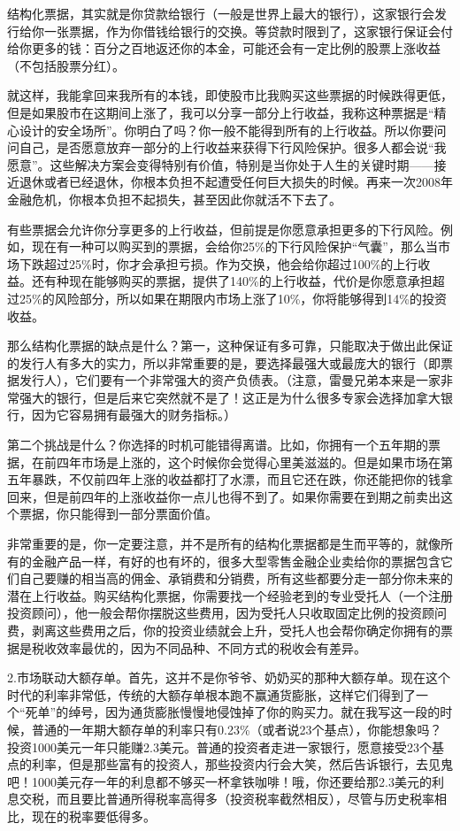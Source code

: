 结构化票据，其实就是你贷款给银行（一般是世界上最大的银行），这家银行会发行给你一张票据，作为你借钱给银行的交换。等贷款时限到了，这家银行保证会付给你更多的钱：百分之百地返还你的本金，可能还会有一定比例的股票上涨收益（不包括股票分红）。

就这样，我能拿回来我所有的本钱，即使股市比我购买这些票据的时候跌得更低，但是如果股市在这期间上涨了，我可以分享一部分上行收益，我称这种票据是“精心设计的安全场所”。你明白了吗？你一般不能得到所有的上行收益。所以你要问问自己，是否愿意放弃一部分的上行收益来获得下行风险保护。很多人都会说“我愿意”。这些解决方案会变得特别有价值，特别是当你处于人生的关键时期——接近退休或者已经退休，你根本负担不起遭受任何巨大损失的时候。再来一次2008年金融危机，你根本负担不起损失，甚至因此你就活不下去了。

有些票据会允许你分享更多的上行收益，但前提是你愿意承担更多的下行风险。例如，现在有一种可以购买到的票据，会给你25\%的下行风险保护“气囊”，那么当市场下跌超过25\%时，你才会承担亏损。作为交换，他会给你超过100\%的上行收益。还有种现在能够购买的票据，提供了140\%的上行收益，代价是你愿意承担超过25\%的风险部分，所以如果在期限内市场上涨了10\%，你将能够得到14\%的投资收益。

那么结构化票据的缺点是什么？第一，这种保证有多可靠，只能取决于做出此保证的发行人有多大的实力，所以非常重要的是，要选择最强大或最庞大的银行（即票据发行人），它们要有一个非常强大的资产负债表。（注意，雷曼兄弟本来是一家非常强大的银行，但是后来它突然就不是了！这正是为什么很多专家会选择加拿大银行，因为它容易拥有最强大的财务指标。）

第二个挑战是什么？你选择的时机可能错得离谱。比如，你拥有一个五年期的票据，在前四年市场是上涨的，这个时候你会觉得心里美滋滋的。但是如果市场在第五年暴跌，不仅前四年上涨的收益都打了水漂，而且它还在跌，你还能把你的钱拿回来，但是前四年的上涨收益你一点儿也得不到了。如果你需要在到期之前卖出这个票据，你只能得到一部分票面价值。

非常重要的是，你一定要注意，并不是所有的结构化票据都是生而平等的，就像所有的金融产品一样，有好的也有坏的，很多大型零售金融企业卖给你的票据包含它们自己要赚的相当高的佣金、承销费和分销费，所有这些都要分走一部分你未来的潜在上行收益。购买结构化票据，你需要找一个经验老到的专业受托人（一个注册投资顾问），他一般会帮你摆脱这些费用，因为受托人只收取固定比例的投资顾问费，剥离这些费用之后，你的投资业绩就会上升，受托人也会帮你确定你拥有的票据是税收效率最优的，因为不同品种、不同方式的税收会有差异。

2.市场联动大额存单。首先，这并不是你爷爷、奶奶买的那种大额存单。现在这个时代的利率非常低，传统的大额存单根本跑不赢通货膨胀，这样它们得到了一个“死单”的绰号，因为通货膨胀慢慢地侵蚀掉了你的购买力。就在我写这一段的时候，普通的一年期大额存单的利率只有0.23\%（或者说23个基点），你能想象吗？投资1000美元一年只能赚2.3美元。普通的投资者走进一家银行，愿意接受23个基点的利率，但是那些富有的投资人，那些投资内行会大笑，然后告诉银行，去见鬼吧！1000美元存一年的利息都不够买一杯拿铁咖啡！哦，你还要给那2.3美元的利息交税，而且要比普通所得税率高得多（投资税率截然相反），尽管与历史税率相比，现在的税率要低得多。


